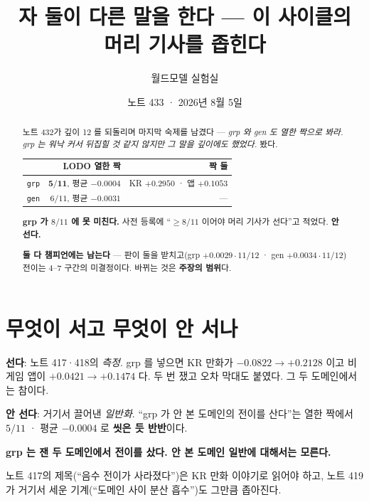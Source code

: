 \documentclass[11pt]{article}
\begin{document}
\title{자 둘이 다른 말을 한다 --- 이 사이클의 머리 기사를 좁힌다}
\author{월드모델 실험실}
\date{노트 433 · 2026년 8월 5일}
\maketitle

\begin{abstract}
노트 432가 깊이 12 를 되돌리며 마지막 숙제를 남겼다 --- \emph{grp 와 gen 도
열한 짝으로 봐라. grp 는 워낙 커서 뒤집힐 것 같지 않지만 그 말을 깊이에도
했었다.} 봤다.

\begin{center}
\begin{tabular}{lrr}
\hline
 & LODO 열한 짝 & 짝 둘 \\
\hline
\texttt{grp} & $\mathbf{5/11}$, 평균 $-0.0004$ & KR $+0.2950$ · 앱 $+0.1053$ \\
\texttt{gen} & $6/11$, 평균 $-0.0031$ & --- \\
\hline
\end{tabular}
\end{center}

\textbf{grp 가 $8/11$ 에 못 미친다.} 사전 등록에 ``$\ge 8/11$ 이어야 머리
기사가 선다''고 적었다. \textbf{안 선다.}

\textbf{둘 다 챔피언에는 남는다} --- 판이 둘을 받치고(grp $+0.0029 \cdot
11/12$ · gen $+0.0034 \cdot 11/12$) 전이는 $4$--$7$ 구간의 미결정이다.
바뀌는 것은 \textbf{주장의 범위}다.
\end{abstract}

\section{무엇이 서고 무엇이 안 서나}

\textbf{선다}: 노트 417·418의 \emph{측정}. grp 를 넣으면 KR 만화가
$-0.0822 \to +0.2128$ 이고 비게임 앱이 $+0.0421 \to +0.1474$ 다. 두 번 쟀고
오차 막대도 붙였다. 그 두 도메인에서는 참이다.

\textbf{안 선다}: 거기서 끌어낸 \emph{일반화}. ``grp 가 안 본 도메인의 전이를
산다''는 열한 짝에서 $5/11$ · 평균 $-0.0004$ 로 \textbf{씻은 듯 반반}이다.

\begin{center}
\textbf{grp 는 잰 두 도메인에서 전이를 샀다. 안 본 도메인 일반에 대해서는
모른다.}
\end{center}

노트 417의 제목(``음수 전이가 사라졌다'')은 KR 만화 이야기로 읽어야 하고,
노트 419가 거기서 세운 기계(``도메인 사이 분산 흡수'')도 그만큼 좁아진다.
\end{document}
